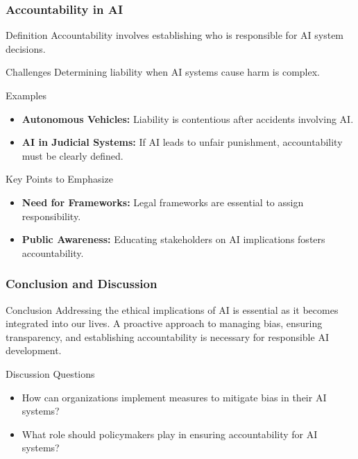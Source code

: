 \documentclass{beamer}
\begin{document}
\begin{frame}[fragile]
    \frametitle{Accountability in AI}
    \begin{block}{Definition}
        Accountability involves establishing who is responsible for AI system decisions.
    \end{block}
    
    \begin{block}{Challenges}
        Determining liability when AI systems cause harm is complex.
    \end{block}

    \begin{block}{Examples}
        \begin{itemize}
            \item \textbf{Autonomous Vehicles:} Liability is contentious after accidents involving AI.
            \item \textbf{AI in Judicial Systems:} If AI leads to unfair punishment, accountability must be clearly defined.
        \end{itemize}
    \end{block}

    \begin{block}{Key Points to Emphasize}
        \begin{itemize}
            \item \textbf{Need for Frameworks:} Legal frameworks are essential to assign responsibility.
            \item \textbf{Public Awareness:} Educating stakeholders on AI implications fosters accountability.
        \end{itemize}
    \end{block}
\end{frame}

\begin{frame}[fragile]
    \frametitle{Conclusion and Discussion}
    \begin{block}{Conclusion}
        Addressing the ethical implications of AI is essential as it becomes integrated into our lives. 
        A proactive approach to managing bias, ensuring transparency, and establishing accountability is necessary for responsible AI development.
    \end{block}

    \begin{block}{Discussion Questions}
        \begin{itemize}
            \item How can organizations implement measures to mitigate bias in their AI systems?
            \item What role should policymakers play in ensuring accountability for AI systems?
        \end{itemize}
    \end{block}
\end{frame}
\end{document}
